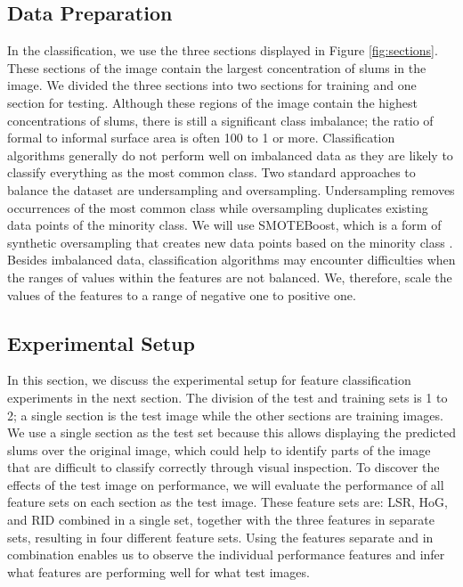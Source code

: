 \subsection{Data Preparation}

In the classification, we use the three sections displayed in Figure \ref{fig:sections}. These sections of the image contain the largest concentration of slums in the image. We divided the three sections into two sections for training and one section for testing. Although these regions of the image contain the highest concentrations of slums, there is still a significant class imbalance; the ratio of formal to informal surface area is often 100 to 1 or more. Classification algorithms generally do not perform well on imbalanced data as they are likely to classify everything as the most common class. Two standard approaches to balance the dataset are undersampling and oversampling. Undersampling removes occurrences of the most common class while oversampling duplicates existing data points of the minority class. We will use SMOTEBoost, which is a form of synthetic oversampling that creates new data points based on the minority class \cite{chawla2003smoteboost}. Besides imbalanced data, classification algorithms may encounter difficulties when the ranges of values within the features are not balanced. We, therefore, scale the values of the features to a range of negative one to positive one.

\subsection{Experimental Setup}

In this section, we discuss the experimental setup for feature classification experiments in the next section. The division of the test and training sets is 1 to 2; a single section is the test image while the other sections are training images. We use a single section as the test set because this allows displaying the predicted slums over the original image, which could help to identify parts of the image that are difficult to classify correctly through visual inspection. To discover the effects of the test image on performance, we will evaluate the performance of all feature sets on each section as the test image. These feature sets are: LSR, HoG, and RID combined in a single set, together with the three features in separate sets, resulting in four different feature sets. Using the features separate and in combination enables us to observe the individual performance features and infer what features are performing well for what test images.

